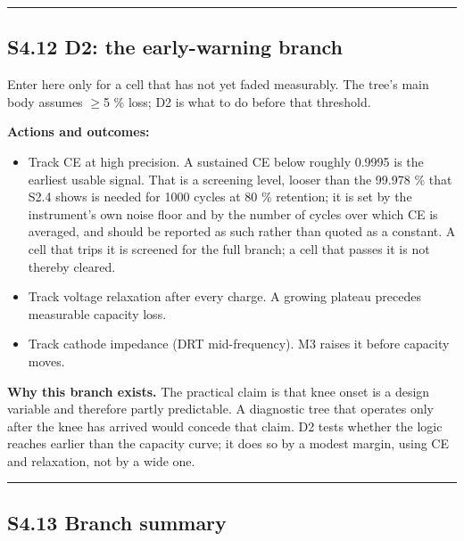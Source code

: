 \documentclass[11pt,a4paper]{article}
\begin{document}
\par\noindent\rule{\linewidth}{0.4pt}\par


\subsection*{S4.12 D2: the early-warning branch}


Enter here only for a cell that has not yet faded measurably. The tree's main body assumes \ensuremath{\geq}5 \% loss; D2 is what to do before that threshold.


\textbf{Actions and outcomes:}


\begin{itemize}
  \item Track CE at high precision. A sustained CE below roughly 0.9995 is the earliest usable signal. That is a screening level, looser than the 99.978 \% that S2.4 shows is needed for 1000 cycles at 80 \% retention; it is set by the instrument's own noise floor and by the number of cycles over which CE is averaged, and should be reported as such rather than quoted as a constant. A cell that trips it is screened for the full branch; a cell that passes it is not thereby cleared.
  \item Track voltage relaxation after every charge. A growing plateau precedes measurable capacity loss.
  \item Track cathode impedance (DRT mid-frequency). M3 raises it before capacity moves.
\end{itemize}


\textbf{Why this branch exists.} The practical claim is that knee onset is a design variable and therefore partly predictable. A diagnostic tree that operates only after the knee has arrived would concede that claim. D2 tests whether the logic reaches earlier than the capacity curve; it does so by a modest margin, using CE and relaxation, not by a wide one.


\par\noindent\rule{\linewidth}{0.4pt}\par


\subsection*{S4.13 Branch summary}
\end{document}
